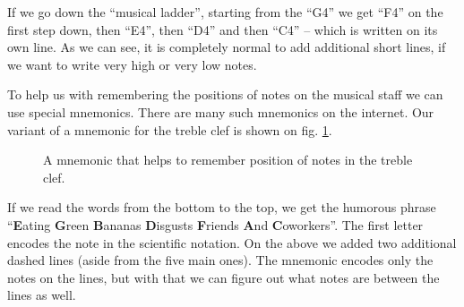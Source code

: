 \documentclass[../sparc.tex]{subfiles}
\begin{document}
If we go down the ``musical ladder'', starting from the ``G4'' we get ``F4'' on
the first step down, then ``E4'', then ``D4'' and then ``C4'' -- which is written
on its own line.  As we can see, it is completely normal to add additional short
lines, if we want to write very high or very low notes.

To help us with remembering the positions of notes on the musical staff we can
use special mnemonics.  There are many such mnemonics on the internet.  Our
variant of a mnemonic for the treble clef is shown on
fig. \ref{fig:lilypond-music-clef-mnemonic}.

\begin{figure}[ht]
  \label{fig:lilypond-music-clef-mnemonic}
  \caption{A mnemonic that helps to remember position of notes in the treble
    clef.}
\end{figure}

If we read the words from the bottom to the top, we get the humorous phrase
``\textbf{E}ating \textbf{G}reen \textbf{B}ananas \textbf{D}isgusts
\textbf{F}riends \textbf{A}nd \textbf{C}oworkers''.  The first letter encodes
the note in the scientific notation.  On the above we added two additional
dashed lines (aside from the five main ones).  The mnemonic encodes only the
notes on the lines, but with that we can figure out what notes are between the
lines as well.
\end{document}
